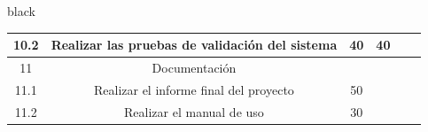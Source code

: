 \documentclass[11pt]{charter}
\begin{document}
\begin{consigna}{black}
\begin{table}[]
\begin{tabular}{|c|c|c|c|c|c|}
10.2                                                                                           & Realizar las pruebas de validación del sistema                                     & 40 & 40           &              &                                                                     \\ \hline
\rowcolor[HTML]{CBCEFB} 
11                                                                                             & Documentación                                                                      &    &              &              &                                                                     \\ \hline
11.1                                                                                           & Realizar el informe final del proyecto                                             & 50 &              &              &                                                                     \\ \hline
11.2                                                                                           & Realizar el manual de uso                                                          & 30 &              &              &                                                                     \\ \hline
\end{tabular}
\end{table}
\end{consigna}
\end{document}

